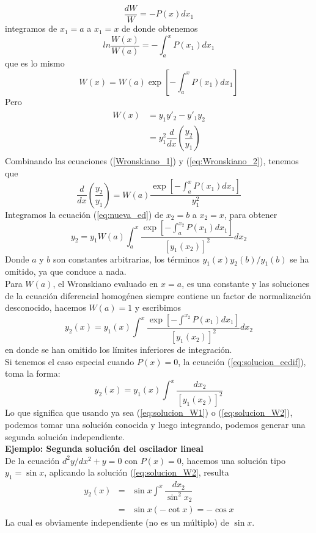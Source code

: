 \[ \dfrac{d W}{W} = - P(x) d x_{1} \]
integramos de $x_{1} = a$ a $x_{1} =  x$ de donde obtenemos
\[ ln \dfrac{W(x)}{W(a)} = - \int_{a}^{x} P(x_{1}) dx_{1}  \]
que es lo mismo
\begin{equation}
W(x) = W(a) \exp \left[ - \int_{a}^{x} P(x_{1}) d x_{1} \right] \label{Wronskiano_1}
\end{equation}
Pero
\begin{eqnarray}
\begin{aligned}
W(x) &= y_{1} y'_{2} - y'_{1} y_{2} \\
&= y^{2}_{1} \dfrac{d}{dx} \left( \dfrac{y_{2}}{y_{1}} \right) \label{eq:Wronskiano_2}
\end{aligned}
\end{eqnarray}
Combinando las ecuaciones (\ref{Wronskiano_1}) y (\ref{eq:Wronskiano_2}), tenemos que
\begin{equation}
\dfrac{d}{dx} \left( \dfrac{y_{2}}{y_{1}} \right) =  W(a) \dfrac{\exp \left[ - \int_{a}^{x} P(x_{1}) d x_{1} \right]}{y^{2}_{1}} \label{eq:nueva_ed}
\end{equation}
Integramos la ecuación (\ref{eq:nueva_ed}) de $x_{2} = b$ a $x_{2} = x$, para obtener
\begin{equation}
y_{2} = y_{1} W(a) \int_{a}^{x} \dfrac{\exp \left[ - \int_{a}^{x_{2}} P(x_{1}) d x_{1} \right]}{[y_{1}(x_{2})]^{2}} dx_{2} \label{eq:solucion_ecdif}
\end{equation}
Donde $a$ y $b$ son constantes arbitrarias, los términos $y_{1}(x)y_{2}(b)/y_{1}(b)$ se ha omitido, ya que conduce a nada.
\\
Para $W(a)$, el Wronskiano evaluado en $x=a$, es una constante y las soluciones de la ecuación diferencial homogénea siempre contiene un factor de normalización desconocido, hacemos $W(a)=1$ y escribimos
\begin{equation}
y_{2}(x) =  y_{1}(x) \int^{x} \dfrac{\exp \left[ - \int^{x_{2}} P(x_{1}) d x_{1} \right]}{[y_{1}(x_{2})]^{2}} dx_{2} \label{eq:solucion_W1}
\end{equation}
en donde se han omitido los límites inferiores de integración. 
\\
Si tenemos el caso especial cuando $P(x)=0$, la ecuación (\ref{eq:solucion_ecdif}), toma la forma:
\begin{equation}
y_{2}(x) =  y_{1}(x) \int^{x} \dfrac{dx_{2}}{[y_{1}(x_{2})]^{2}} \label{eq:solucion_W2}
\end{equation}
Lo que significa que usando ya sea (\ref{eq:solucion_W1}) o (\ref{eq:solucion_W2}), podemos tomar una solución conocida y luego integrando, podemos generar una segunda solución independiente.
\\
\textbf{Ejemplo: Segunda solución del oscilador lineal}
\\
De la ecuación $d^{2} y / dx^{2} + y = 0$ con $P(x)=0$, hacemos una solución tipo $y_{1} = \sin x$, aplicando la solución (\ref{eq:solucion_W2}, resulta
\begin{eqnarray*}
y_{2}(x) &=& \sin x \int^{x} \dfrac{dx_{2}}{\sin^{2} x_{2}} \\
&=& \sin x (-\cot x) = - \cos x
\end{eqnarray*}
La cual es obviamente independiente (no es un múltiplo) de $\sin x$.
